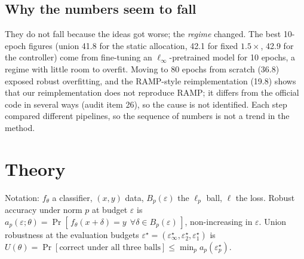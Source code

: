 \documentclass[11pt]{article}
\begin{document}
\subsection{Why the numbers seem to fall}
They do not fall because the ideas got worse; the \emph{regime} changed. The best 10-epoch figures (union 41.8 for the static allocation, 42.1 for fixed $1.5\times$, 42.9 for the controller) come from fine-tuning an $\ell_\infty$-pretrained model for 10 epochs, a regime with little room to overfit.
Moving to 80 epochs from scratch (36.8) exposed robust overfitting, and the RAMP-style reimplementation (19.8) shows that our reimplementation does not reproduce RAMP; it differs from the official code in several ways (audit item 26), so the cause is not identified. Each step compared different pipelines, so the sequence of numbers is not a trend in the method.

\section{Theory}
Notation: $f_\theta$ a classifier, $(x,y)$ data, $B_p(\varepsilon)$ the $\ell_p$ ball, $\ell$ the loss. Robust accuracy under norm $p$ at budget $\varepsilon$ is $a_p(\varepsilon;\theta)=\Pr[\,f_\theta(x{+}\delta)=y\ \ \forall\delta\in B_p(\varepsilon)\,]$, non-increasing in $\varepsilon$.
Union robustness at the evaluation budgets $\varepsilon^\star=(\varepsilon_\infty^\star,\varepsilon_2^\star,\varepsilon_1^\star)$ is $U(\theta)=\Pr[\text{correct under all three balls}]\le\min_p a_p(\varepsilon^\star_p)$.
\end{document}
